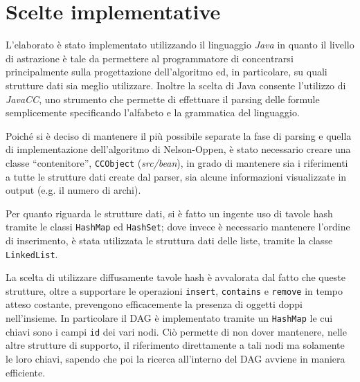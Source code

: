 \documentclass[a4paper,11pt]{article}
\begin{document}
\section{Scelte implementative}
L'elaborato è stato implementato utilizzando il linguaggio \emph{Java} 
in quanto il livello di astrazione è tale da permettere al programmatore 
di concentrarsi principalmente sulla progettazione dell'algoritmo ed, in 
particolare, su quali strutture dati sia meglio utilizzare. 
Inoltre la scelta di Java consente l'utilizzo di \emph{JavaCC}, uno 
strumento che permette di effettuare il parsing delle formule 
semplicemente specificando l'alfabeto e la grammatica del linguaggio.\par
Poiché si è deciso di mantenere il più possibile separate la fase di 
parsing e quella di implementazione dell'algoritmo di Nelson-Oppen, è 
stato necessario creare una classe “contenitore”, \texttt{CCObject} 
(\emph{src/bean}), in grado di mantenere sia i riferimenti a tutte le 
strutture dati create dal parser, sia alcune informazioni visualizzate 
in output (e.g. il numero di archi).\par
Per quanto riguarda le strutture dati, si è fatto un ingente uso di tavole 
hash tramite le classi \texttt{HashMap} ed \texttt{HashSet}; dove invece
è necessario mantenere l'ordine di inserimento, è stata utilizzata le 
struttura dati delle liste, tramite la classe \texttt{LinkedList}.\par
La scelta di utilizzare diffusamente tavole hash è avvalorata dal 
fatto che queste strutture, oltre a supportare le operazioni 
\texttt{insert}, \texttt{contains} e \texttt{remove} in tempo atteso 
costante, prevengono efficacemente la presenza di oggetti doppi nell'insieme.
In particolare il DAG è implementato tramite un \texttt{HashMap} le 
cui chiavi sono i campi \texttt{id} dei vari nodi.
Ciò permette di non dover mantenere, nelle altre strutture di supporto, 
il riferimento direttamente a tali nodi ma solamente le loro chiavi, sapendo 
che poi la ricerca all'interno del DAG avviene in maniera efficiente.
\end{document}
